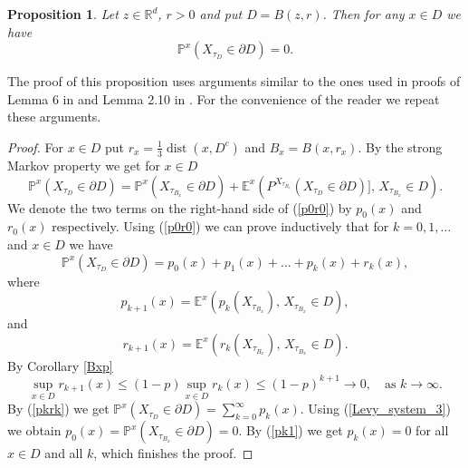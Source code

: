 \documentclass[a4paper,12pt,reqno]{amsart}
\newtheorem{proposition}[theorem]{Proposition}
\theoremstyle{definition}
\theoremstyle{remark}
\newcommand{\Ee}{\mathds{E}} %
\newcommand{\Pp}{\mathds{P}} %
\newcommand{\R}{\mathds{R}}
\DeclareMathOperator{\dist}{dist}
\begin{document}
\begin{proposition}
\label{harmonic_measure_boundary}
Let $z \in \R^d$, $r > 0$ and put $D = B(z,r)$. Then for any $x \in D$ we have
$$
\Pp^x(X_{\tau_{D}} \in \partial D) = 0.
$$
\end{proposition}
The proof of this proposition uses arguments similar to the ones used in proofs of Lemma 6 in \cite{B1997} and Lemma 2.10 in \cite{KS2006}. For the convenience of the reader we repeat these arguments.
\begin{proof}
For $x \in D$ put $r_x = \frac{1}{3}\dist(x,D^c)$ and $B_x = B(x,r_x)$. By the strong Markov property we get for $x \in D$
\begin{equation}
\label{p0r0}
\Pp^x(X_{\tau_{D}} \in \partial D) =
\Pp^x(X_{\tau_{B_x}} \in \partial D) + 
\Ee^x\left(P^{X_{\tau_{B_x}}}(X_{\tau_{D}} \in \partial D)], \, X_{\tau_{B_x}} \in D\right).
\end{equation}
We denote the two terms on the right-hand side of (\ref{p0r0}) by $p_0(x)$ and $r_0(x)$ respectively. Using (\ref{p0r0}) we can prove inductively that for $k = 0, 1, \ldots$ and $x \in D$ we have
\begin{equation}
\label{pkrk}
\Pp^x(X_{\tau_{D}} \in \partial D) = p_0(x) + p_1(x) + \ldots + p_{k}(x) + r_k(x),
\end{equation}
where
\begin{equation}
\label{pk1}
p_{k + 1}(x) = \Ee^x\left(p_k(X_{\tau_{B_x}}), \, X_{\tau_{B_x}} \in D\right),
\end{equation}
and
$$
r_{k + 1}(x) = \Ee^x\left(r_k(X_{\tau_{B_x}}), \, X_{\tau_{B_x}} \in D\right).
$$
By Corollary \ref{Bxp}
$$
\sup_{x \in D} r_{k + 1}(x) \le (1 - p) \sup_{x \in D} r_{k}(x) \le (1- p)^{k + 1} \to 0, \quad \text{as $k \to \infty$.}
$$
By (\ref{pkrk}) we get $\displaystyle \Pp^x(X_{\tau_{D}} \in \partial D) = \sum_{k = 0}^{\infty} p_k(x)$. 
Using
 (\ref{Levy_system_3}) we obtain $p_{0}(x) = \Pp^x(X_{\tau_{B_x}} \in \partial D) = 0$. 
By (\ref{pk1}) we get $p_k(x) = 0$ for all $x \in D$ and all $k$, which finishes the proof. 
\end{proof}
\end{document}
